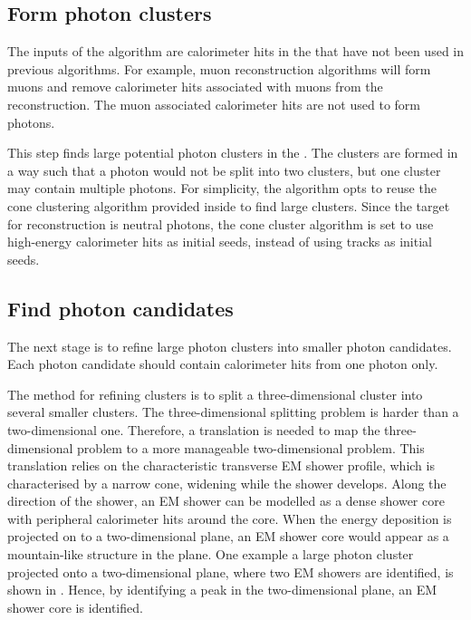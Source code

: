 \subsection{Form photon clusters}

The inputs of the \PhotonReconstruction algorithm are calorimeter hits in the \ECAL that have not been used in previous algorithms. For example, muon reconstruction algorithms will form muons and remove calorimeter hits associated with muons from the reconstruction. The muon associated calorimeter hits are not used to form photons.

This step finds large potential photon clusters in the \ECAL. The clusters are formed in a way such that a photon would not be split into two clusters, but one cluster may contain multiple photons. For simplicity, the algorithm opts to reuse  the cone clustering algorithm  provided inside \pandora to find large clusters.  Since the target for reconstruction is neutral photons, the cone cluster algorithm is set to use high-energy \ECAL calorimeter hits as initial seeds, instead of using tracks as initial seeds.  %

\subsection{Find photon candidates}
\label{sec:photonCandiate}

The next stage is to refine large photon clusters into smaller photon candidates. Each photon candidate should contain calorimeter hits from one photon only.

The method for refining clusters is to split a three-dimensional cluster into several smaller clusters. The three-dimensional splitting problem is harder than a two-dimensional one. Therefore, a translation is needed to map the three-dimensional problem to a more manageable two-dimensional problem. This translation relies on the characteristic  transverse EM shower profile, which is characterised by a narrow cone, widening while the shower develops. Along the direction of the shower, an  EM shower can be modelled as a dense shower core with peripheral calorimeter hits around the core. When the energy deposition is projected on to a two-dimensional plane, an EM shower core would appear as a mountain-like structure in the plane. One example  a large photon cluster projected onto a two-dimensional plane, where two EM showers are identified, is shown in . Hence, by identifying a peak in the two-dimensional plane, an EM shower core is identified.

